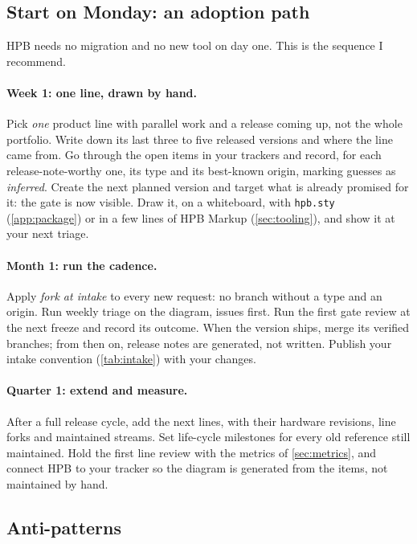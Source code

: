 \subsection{Start on Monday: an adoption path}
\label{subsec:method-adoption}

HPB needs no migration and no new tool on day one. This is the sequence I
recommend.

\paragraph{Week 1: one line, drawn by hand.}
Pick \emph{one} product line with parallel work and a release coming up,
not the whole portfolio. Write down its last three to five released
versions and where the line came from. Go through the open items in your
trackers and record, for each release-note-worthy one, its type and its
best-known origin, marking guesses as \emph{inferred}. Create the next
planned version and target what is already promised for it: the gate is
now visible. Draw it, on a whiteboard, with \texttt{hpb.sty}
(\cref{app:package}) or in a few lines of HPB Markup (\cref{sec:tooling}),
and show it at your next triage.

\paragraph{Month 1: run the cadence.}
Apply \emph{fork at intake} to every new request: no branch without a type
and an origin. Run weekly triage on the diagram, issues first. Run the
first gate review at the next freeze and record its outcome. When the
version ships, merge its verified branches; from then on, release notes
are generated, not written. Publish your intake convention
(\cref{tab:intake}) with your changes.

\paragraph{Quarter 1: extend and measure.}
After a full release cycle, add the next lines, with their hardware
revisions, line forks and maintained streams. Set life-cycle milestones
for every old reference still maintained. Hold the first line review with
the metrics of \cref{sec:metrics}, and connect HPB to your tracker so the
diagram is generated from the items, not maintained by hand.

\subsection{Anti-patterns}
\label{subsec:method-antipatterns}

